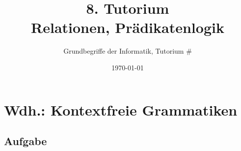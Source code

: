 




\title[Relationen, Prädikatenlogik]{8. Tutorium\\ Relationen, Prädikatenlogik}
\subtitle{Grundbegriffe der Informatik, Tutorium \#\mytutnumber}
\date{\today}


\titleframe
\roadmap

\section[Kontextfreie Grammatiken]{Wdh.: Kontextfreie Grammatiken}
\subsection{Aufgabe}

